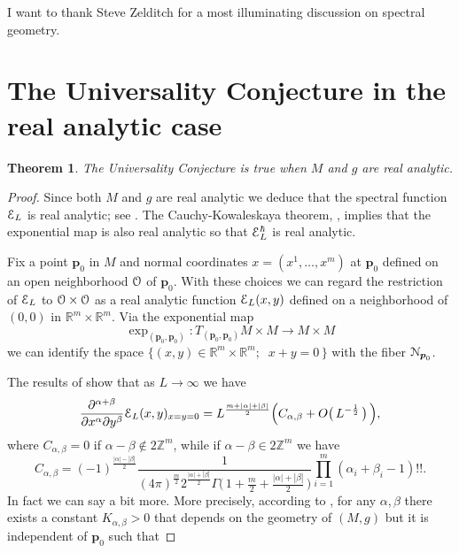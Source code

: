 \documentclass[reqno, 11pt]{amsart}
\newtheorem{theorem}{Theorem}[section]
\theoremstyle{definition}
\numberwithin{equation}{section}
\begin{document}
\smallskip

 I  want to thank  Steve Zelditch for a most illuminating discussion  on    spectral geometry. 

\section{The Universality Conjecture in the real analytic case}
\setcounter{equation}{0}
\label{s: real-an}

\begin{theorem}  The Universality Conjecture is true  when $M$ and $g$ are real analytic. 
\label{th: conj}
\end{theorem}

\begin{proof} Since both $M$ and $g$ are real analytic we deduce that the  spectral function ${\EuScript{E}}_L$ is real analytic; see \cite{LM, Mo}.    The  Cauchy-Kowaleskaya theorem,  \cite{KP}, implies  that the exponential map  is also real analytic so that ${\EuScript{E}}_L^\hbar$ is real analytic.

 Fix  a point ${{\boldsymbol{p}}}_0$ in $M$ and normal coordinates $x=(x^1,\dotsc, x^m)$  at ${{\boldsymbol{p}}}_0$ defined on an open neighborhood ${\EuScript{O}}$ of ${{\boldsymbol{p}}}_0$.    With these choices we can  regard the restriction of  ${\EuScript{E}}_L$ to  ${\EuScript{O}}\times {\EuScript{O}}$  as a real analytic function ${\EuScript{E}}_L(x,y)$ defined on a neighborhood of $(0,0)$ in ${{\mathbb R}}^m\times {{\mathbb R}}^m$.        Via the exponential map 
\[
\exp_{({{\boldsymbol{p}}}_0,{{\boldsymbol{p}}}_0)} : T_{({{\boldsymbol{p}}}_0,{{\boldsymbol{p}}}_0)} M\times M{\rightarrow} M\times M
\]
 we can  identify the    space $\bigl\{ (x,y)\in{{\mathbb R}}^m\times {{\mathbb R}}^m;\;\;x+y=0\,\bigr\}$ with the   fiber ${\EuScript{N}}_{{{\boldsymbol{p}}}_0}$.

The results  of  \cite{Bin} show that as $L{\rightarrow} \infty$ we have
\begin{equation}
\frac{{\partial} ^{\alpha+\beta}}{{\partial} x^\alpha {\partial} y^\beta}{\EuScript{E}}_L(x,y)_{x=y=0}= L^{\frac{m+|\alpha|+|\beta|}{2}}\Bigl(C_{\alpha,\beta}+ O\bigl(\,L^{-\frac{1}{2}}\,\bigr)\,\Bigr),
\label{eq: 1}
\end{equation}
where $C_{\alpha,\beta}=0$ if $\alpha-\beta\not\in 2{{\mathbb Z}}^m$,    while if $\alpha-\beta\in 2{{\mathbb Z}}^m$ we have
\[
C_{\alpha,\beta}=(-1)^{\frac{|\alpha|-|\beta|}{2}}\frac{1}{(4\pi)^{\frac{m}{2}} 2^{\frac{|\alpha|+|\beta|}{2}}\Gamma\bigl(\, 1+\frac{m}{2}+\frac{|\alpha|+|\beta|}{2}\,\bigr)}\prod_{i=1}^m( \alpha_i+\beta_i-1)!!.
\]
In fact we can say a bit more. More precisely, according to \cite[Thm. 17.5.3]{Ho3},  for any $\alpha,\beta$  there exists a  constant $K_{\alpha,\beta}>0$  that depends on the geometry of $(M,g)$ but it is independent of ${{\boldsymbol{p}}}_0$ such that


\end{proof}
\end{document}

